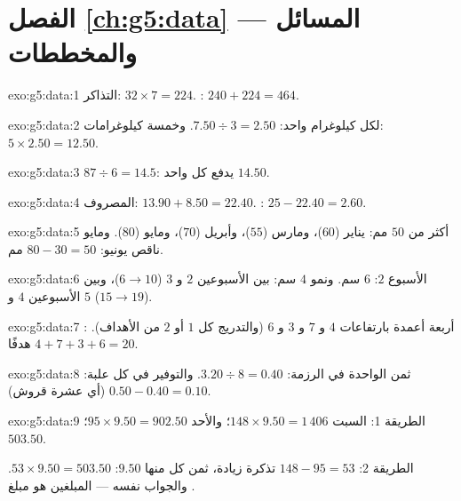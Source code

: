 \section*{الفصل \ref{ch:g5:data} --- المسائل والمخططات}

\begin{solution}{exo:g5:data:1}
التذاكر: $32 \times 7 = 224$. : $240 + 224 = 464$.
\end{solution}

\begin{solution}{exo:g5:data:2}
لكل كيلوغرام واحد: $7.50 \div 3 = 2.50$. وخمسة كيلوغرامات:
$5 \times 2.50 = 12.50$.
\end{solution}

\begin{solution}{exo:g5:data:3}
$87 \div 6 = 14.5$: يدفع كل واحد $14.50$.
\end{solution}

\begin{solution}{exo:g5:data:4}
المصروف: $13.90 + 8.50 = 22.40$. : $25 - 22.40 = 2.60$.
\end{solution}

\begin{solution}{exo:g5:data:5}
أكثر من $50$ مم: يناير ($60$)، ومارس ($55$)، وأبريل ($70$)، ومايو
($80$). ومايو ناقص يونيو: $80 - 30 = 50$ مم.
\end{solution}

\begin{solution}{exo:g5:data:6}
الأسبوع $2$: $6$ سم. ونمو $4$ سم: بين الأسبوعين $2$ و $3$
($6 \to 10$)، وبين الأسبوعين $4$ و $5$ ($15 \to 19$).
\end{solution}

\begin{solution}{exo:g5:data:7}
أربعة أعمدة بارتفاعات $4$ و $7$ و $3$ و $6$ (والتدريج كل $1$ أو
$2$ من الأهداف). : $4 + 7 + 3 + 6 = 20$ هدفًا.
\end{solution}

\begin{solution}{exo:g5:data:8}
ثمن الواحدة في الرزمة: $3.20 \div 8 = 0.40$. والتوفير في كل علبة:
$0.50 - 0.40 = 0.10$ (أي عشرة قروش).
\end{solution}

\begin{solution}{exo:g5:data:9}
الطريقة 1: السبت $148 \times 9.50 = 1\,406$؛ والأحد
$95 \times 9.50 = 902.50$؛  $503.50$.

الطريقة 2: $148 - 95 = 53$ تذكرة زيادة، ثمن كل منها $9.50$:
$53 \times 9.50 = 503.50$. والجواب نفسه --- 
المبلغين هو مبلغ .
\end{solution}

